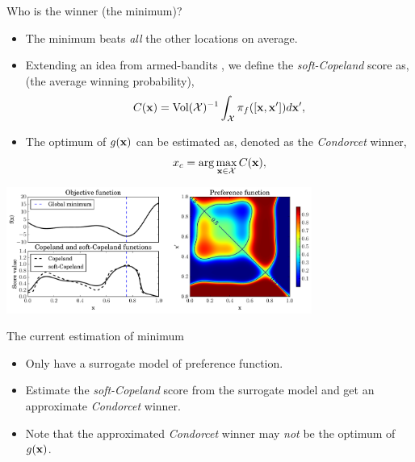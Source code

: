\documentclass[13pt,aspectratio=1610]{beamer}
\begin{document}
\begin{frame}{Who is the winner (the minimum)?}
\begin{itemize}
\item The minimum beats \emph{all} the other locations on average.
\item Extending an idea from armed-bandits \citep{NIPS2015_6023}, we define the \emph{soft-Copeland} score as, (the average winning probability),
\begin{equation*}
C({\bf x})= \text{Vol} ({\mathcal X})^{-1} \int_{\mathcal X} \pi_{f}([{\bf x},{\bf x}']) d{\bf x}',
\end{equation*}
\item The optimum of $g({\bf x})$ can be estimated as, denoted as the \emph{Condorcet} winner,
$$x_{c} = \arg \max_{\mathbf{x} \in {\mathcal X}} C(\mathbf{x}),$$
\end{itemize}
%
\centering
\vspace{-5mm}
\includegraphics[width=0.75\textwidth]{condorcet.pdf}
\end{frame}

\begin{frame}{The current estimation of minimum}
\begin{itemize}
\item Only have a surrogate model of preference function.
\item Estimate the \emph{soft-Copeland} score from the surrogate model and get an approximate \emph{Condorcet} winner.
\item Note that the approximated \emph{Condorcet} winner may \emph{not} be the optimum of $g({\bf x})$.
\end{itemize}
%
\end{frame}
\end{document}
